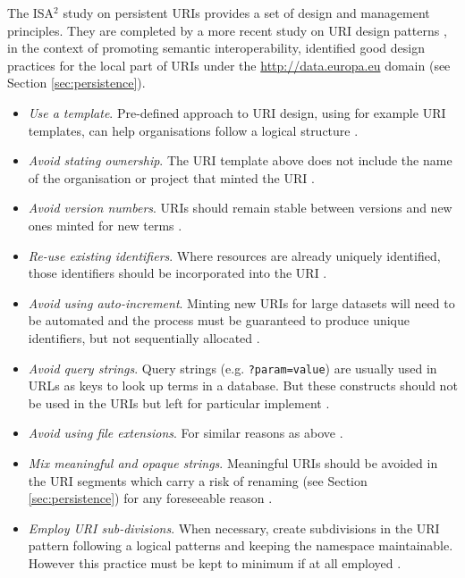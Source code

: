 	The ISA$^2$ study on persistent URIs \cite{d7.1.3-2012} provides a set of design and management principles. They are completed by a more recent study on URI design patterns \citep{d4.02.02-2018}, in the context of promoting semantic interoperability, identified good design practices for the local part of URIs under the \url{http://data.europa.eu} domain (see Section \ref{sec:persistence}).
	
	\begin{itemize}
		\item \textit{Use a template}. Pre-defined approach to URI design, using for example URI templates, can help organisations follow a logical structure \cite{d7.1.3-2012,d4.02.02-2018}.
		\item \textit{Avoid stating ownership}. The URI template above does not include the name of the organisation or project that minted the URI \cite{d7.1.3-2012,d4.02.02-2018}.
		\item \textit{Avoid version numbers}. URIs should remain stable between versions and new ones minted for new terms \cite{d7.1.3-2012,d4.02.02-2018}.
		\item \textit{Re-use existing identifiers}. Where resources are already uniquely identified, those identifiers should be incorporated into the URI \cite{d7.1.3-2012}.
		\item \textit{Avoid using auto-increment}. Minting new URIs for large datasets will need to be automated and the process must be guaranteed to produce unique identifiers, but not sequentially allocated \cite{d7.1.3-2012}. 
		\item \textit{Avoid query strings}. Query strings (e.g. \texttt{?param=value}) are usually used in URLs as keys to look up terms in a database. But these constructs should not be used in the URIs but left for particular implement \cite{d7.1.3-2012}. 
		\item \textit{Avoid using file extensions}. For similar reasons as above \cite{d7.1.3-2012}. 
		\item \textit{Mix meaningful and opaque strings}. Meaningful URIs should be avoided in the URI segments which carry a risk of renaming (see Section \ref{sec:persistence}) for any foreseeable reason \cite{d4.02.02-2018}.  
		\item \textit{Employ URI sub-divisions}. When necessary, create subdivisions in the URI pattern following a logical patterns and keeping the namespace maintainable. However this practice must be kept to minimum if at all employed \cite{d4.02.02-2018}. 		
	\end{itemize}
	
